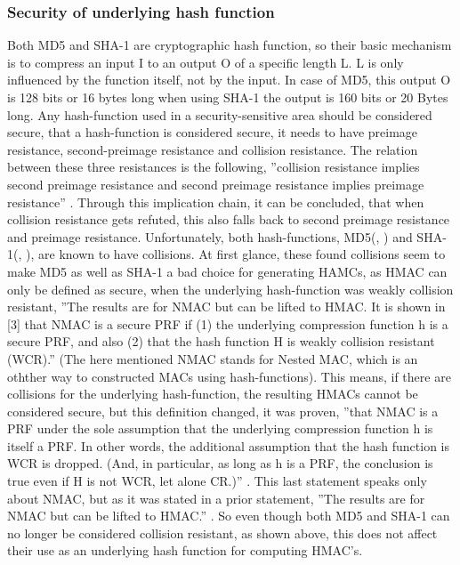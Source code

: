 \subsubsection{Security of underlying hash function}
Both MD5 and SHA-1 are cryptographic hash function, so their basic mechanism is to compress an input I to an output O of a specific length L. L is only influenced by the function itself, not by the input. In case of MD5, this output O is 128 bits or 16 bytes \cite{BAV} long when using SHA-1 the output is 160 bits or 20 Bytes \cite{BAV} long. Any hash-function used in a security-sensitive area should be considered secure, that a hash-function is considered secure, it needs to have preimage resistance, second-preimage resistance and collision resistance. The relation between these three resistances is the following, ''collision resistance implies second preimage resistance and second preimage resistance implies preimage resistance'' \cite{SPR-res}. Through this implication chain, it can be concluded, that when collision resistance gets refuted, this also falls back to second preimage resistance and preimage resistance. Unfortunately, both hash-functions, MD5(\cite{COL1}, \cite{COL2}) and SHA-1(\cite{COL3}, \cite{COL4}), are known to have collisions. At first glance, these found collisions seem to make MD5 as well as SHA-1 a bad choice for generating HAMCs, as HMAC can only be defined as secure, when the underlying hash-function was weakly collision resistant, ''The results are for NMAC but can be lifted to HMAC. It is shown in [3] that NMAC is a secure PRF if (1) the underlying compression function h is a secure PRF, and also (2) that the hash function H is weakly collision resistant (WCR).'' \cite{HMAC-SEC1}(The here mentioned NMAC stands for Nested MAC, which is an othther way to constructed MACs using hash-functions). This means, if there are collisions for the underlying hash-function, the resulting HMACs cannot be considered secure, but this definition changed, it was proven, ''that NMAC is a PRF under the sole assumption that the underlying compression function h is itself a PRF. In other words, the additional assumption that the hash function is WCR is dropped. (And, in particular, as long as h is a PRF, the conclusion is true even if H is not WCR, let alone CR.)'' \cite{HMAC-SEC1}. This last statement speaks only about NMAC, but as it was stated in a prior statement, ''The results are for NMAC but can be lifted to HMAC.'' \cite{HMAC-SEC1}. So even though both MD5 and SHA-1 can no longer be considered collision resistant, as shown above, this does not affect their use as an underlying hash function for computing HMAC's.
